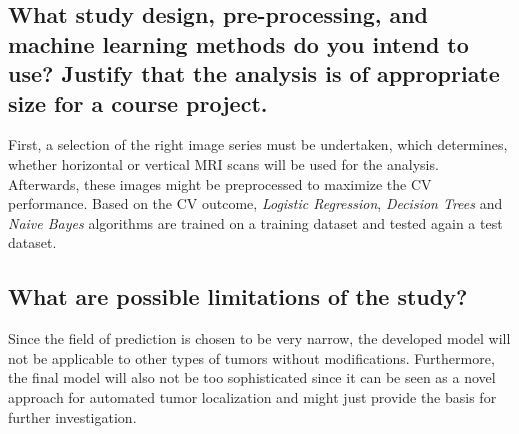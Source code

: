 \documentclass[twoside,11pt]{article}
\begin{document}
\subsection{What study design, pre-processing, and machine learning methods do you intend to use? Justify that the analysis is of appropriate size for a course project.}
First, a selection of the right image series must be undertaken, which determines, whether horizontal or vertical MRI scans will be used for the analysis. Afterwards, these images might be preprocessed to maximize the CV performance. Based on the CV outcome, \textit{Logistic Regression}, \textit{Decision Trees} and \textit{Naive Bayes} algorithms are trained on a training dataset and tested again a test dataset.

\subsection{What are possible limitations of the study?}
Since the field of prediction is chosen to be very narrow, the developed model will not be applicable to other types of tumors without modifications. Furthermore, the final model will also not be too sophisticated since it can be seen as a novel approach for automated
tumor localization and might just provide the basis for further investigation.


\end{document}
